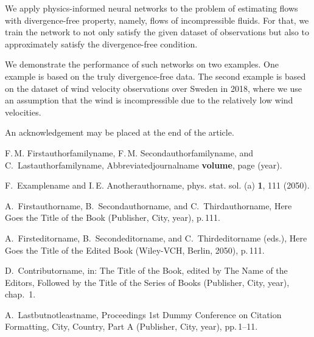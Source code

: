 \documentclass[pamm,a4paper,fleqn]{w-art}
\begin{document}
We apply physics-informed neural networks to the problem of estimating flows
with divergence-free property, namely, flows of incompressible fluids.
For that, we train the network to not only satisfy the given dataset of
observations but also to approximately satisfy the divergence-free condition.

We demonstrate the performance of such networks on two examples.
One example is based on the truly divergence-free data.
The second example is based on the dataset of wind velocity observations over
Sweden in 2018, where we use an assumption that the wind is incompressible due
to the relatively low wind velocities.




\begin{acknowledgement}
  An acknowledgement may be placed at the end of the article.
\end{acknowledgement}

\vspace{\baselineskip}

\begin{thebibliography}{1}

% 
 F.\,M. Firstauthorfamilyname, F.\,M. Secondauthorfamilyname, and
  C.~Lastauthorfamilyname,
 Abbreviatedjournalname \textbf{volume}, page (year).

% 
 F.~Examplename and  I.\,E. Anotherauthorname,
 phys. stat. sol. (a) \textbf{1}, 111 (2050).

% 
 A.~Firstauthorname,  B.~Secondauthorname,  and
  C.~Thirdauthorname,
Here Goes the Title of the Book (Publisher, City, year), p.\,111.

% 
 A.~Firsteditorname,  B.~Secondeditorname,  and
  C.~Thirdeditorname (eds.),
Here Goes the Title of the Edited Book (Wiley-VCH, Berlin, 2050), p.\,111.

% 
 D.~Contributorname,
 in: The Title of the Book, edited by The Name of the Editors, Followed by
  the Title of the Series of Books (Publisher, City, year), chap.~1.

% 
 A.~Lastbutnotleastname,
 Proceedings 1st Dummy Conference on Citation Formatting, City,
  Country, Part A (Publisher, City, year),  pp.\,1--11.

\end{thebibliography}
\end{document}

